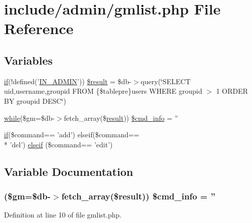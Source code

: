 \hypertarget{gmlist_8php}{\section{include/admin/gmlist.php File Reference}
\label{gmlist_8php}
}
\subsection*{Variables}
\begin{DoxyCompactItemize}
\item 
\hyperlink{login__old_8php_a4ac1118c2e44c513a674bc1793ba6c90}{if}(!defined('\hyperlink{admin_8php_ad49472b0cdee543164375bf133a537f1}{I\+N\+\_\+\+A\+D\+M\+I\+N}')) \hyperlink{gmlist_8php_a3d355e0c1f1851fe7486bca611550a5f}{\$result} = \$db-\/$>$query(\char`\"{}S\+E\+L\+E\+C\+T uid,username,groupid F\+R\+O\+M \{\$tablepre\}users W\+H\+E\+R\+E groupid $>$ 1 O\+R\+D\+E\+R B\+Y groupid D\+E\+S\+C\char`\"{})
\item 
\hyperlink{stat_8php_ab54633a8fada54bedd1fe3c2635cfaeb}{while}(\$gm=\$db-\/$>$fetch\+\_\+array(\$\hyperlink{templates_2install_8php_abdecde238169a1e34f68354fc9968af0}{result})) \hyperlink{gmlist_8php_add3dadbfc82133e0ffb055d6f5111e57}{\$cmd\+\_\+info} = ''
\item 
\hyperlink{login__old_8php_a4ac1118c2e44c513a674bc1793ba6c90}{if}(\$command== 'add') elseif(\$command== \\*
'del') \hyperlink{gmlist_8php_a311ef487b52409c05de3e8386f968240}{elseif} (\$command== 'edit')
\end{DoxyCompactItemize}


\subsection{Variable Documentation}
\hypertarget{gmlist_8php_add3dadbfc82133e0ffb055d6f5111e57}{
\subsubsection[{\$cmd\+\_\+info}]{ (\$gm=\$db-\/$>$fetch\+\_\+array(\${\bf result})) \$cmd\+\_\+info = ''}}\label{gmlist_8php_add3dadbfc82133e0ffb055d6f5111e57}


Definition at line 10 of file gmlist.\+php.

